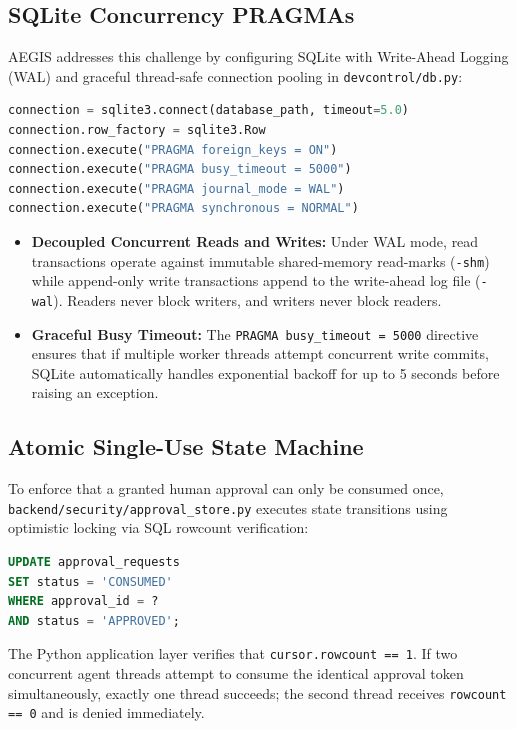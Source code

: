 \subsection{SQLite Concurrency PRAGMAs}
AEGIS addresses this challenge by configuring SQLite with Write-Ahead Logging (WAL) and graceful thread-safe connection pooling in \texttt{devcontrol/db.py}:
\begin{lstlisting}[language=Python, caption={SQLite WAL Mode Configuration}]
connection = sqlite3.connect(database_path, timeout=5.0)
connection.row_factory = sqlite3.Row
connection.execute("PRAGMA foreign_keys = ON")
connection.execute("PRAGMA busy_timeout = 5000")
connection.execute("PRAGMA journal_mode = WAL")
connection.execute("PRAGMA synchronous = NORMAL")
\end{lstlisting}
\begin{itemize}
    \item \textbf{Decoupled Concurrent Reads and Writes:} Under WAL mode, read transactions operate against immutable shared-memory read-marks (\texttt{-shm}) while append-only write transactions append to the write-ahead log file (\texttt{-wal}). Readers never block writers, and writers never block readers.
    \item \textbf{Graceful Busy Timeout:} The \texttt{PRAGMA busy\_timeout = 5000} directive ensures that if multiple worker threads attempt concurrent write commits, SQLite automatically handles exponential backoff for up to 5 seconds before raising an exception.
\end{itemize}

\subsection{Atomic Single-Use State Machine}
To enforce that a granted human approval can only be consumed once, \texttt{backend/security/approval\_store.py} executes state transitions using optimistic locking via SQL rowcount verification:
\begin{lstlisting}[language=SQL, caption={Atomic State Transition Query}]
UPDATE approval_requests
SET status = 'CONSUMED'
WHERE approval_id = ?
AND status = 'APPROVED';
\end{lstlisting}
The Python application layer verifies that \texttt{cursor.rowcount == 1}. If two concurrent agent threads attempt to consume the identical approval token simultaneously, exactly one thread succeeds; the second thread receives \texttt{rowcount == 0} and is denied immediately.

